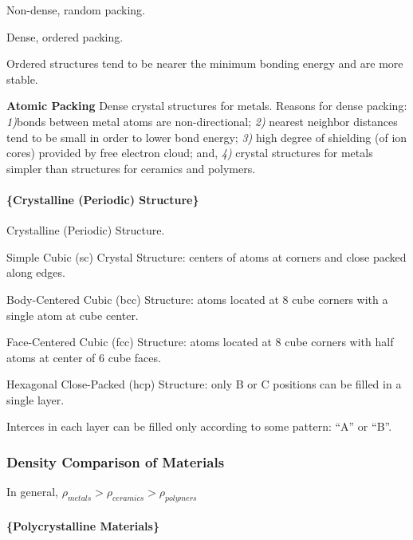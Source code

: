 \documentclass[
]{article}
\begin{document}
\leavevmode\hypertarget{fig:bonding_energy_curves}{}%
{Non-dense, random packing.}

{Dense, ordered packing.}

Ordered structures tend to be nearer the minimum bonding energy and are
more stable.

\textbf{Atomic Packing} Dense crystal structures for metals. Reasons for
dense packing: \textit{1)}bonds between metal atoms are non-directional;
\textit{2)} nearest neighbor distances tend to be small in order to
lower bond energy; \textit{3)} high degree of shielding (of ion cores)
provided by free electron cloud; and, \textit{4)} crystal structures for
metals simpler than structures for ceramics and polymers.

\hypertarget{crystalline-periodic-structure}{%
\paragraph{\{Crystalline (Periodic)
Structure\}}\label{crystalline-periodic-structure}}

{Crystalline (Periodic) Structure.}

{Simple Cubic (sc) Crystal Structure: centers of atoms at corners and
close packed along edges.}

{Body-Centered Cubic (bcc) Structure: atoms located at 8 cube corners
with a single atom at cube center.}

{Face-Centered Cubic (fcc) Structure: atoms located at 8 cube corners
with half atoms at center of 6 cube faces.}

{Hexagonal Close-Packed (hcp) Structure: only B or C positions can be
filled in a single layer.}

{Interces in each layer can be filled only according to some pattern:
``A'' or ``B''.}

\hypertarget{density-comparison-of-materials}{%
\subsubsection{Density Comparison of
Materials}\label{density-comparison-of-materials}}

{In general, \(\rho_{metals} > \rho_{ceramics} > \rho_{polymers}\)}

\hypertarget{polycrystalline-materials}{%
\paragraph{\{Polycrystalline
Materials\}}\label{polycrystalline-materials}}
\end{document}
